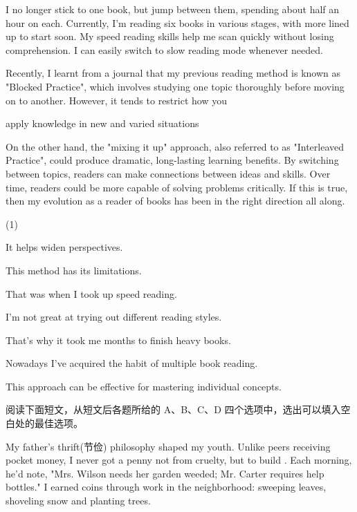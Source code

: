 \documentclass{英语试卷}
\begin{document}
\par {} I no longer stick to one book, but jump between them, spending about half an hour on each. Currently, I'm reading six books in various stages, with more lined up to start soon. My speed reading skills help me scan quickly without losing comprehension. I can easily switch to slow reading mode whenever needed.\par
\par Recently, I learnt from a journal that my previous reading method is known as "Blocked Practice", which involves studying one topic thoroughly before moving on to another.  However, it tends to restrict how you\par
\par apply knowledge in new and varied situations\par
\par On the other hand, the "mixing it up" approach, also referred to as "Interleaved Practice", could produce dramatic, long-lasting learning benefits. By switching between topics, readers can make connections between ideas and skills.  Over time, readers could be more capable of solving problems critically. If this is true, then my evolution as a reader of books has been in the right direction all along.\par
\begin{choices}(1)
  \item It helps widen perspectives.
  \item This method has its limitations.
  \item That was when I took up speed reading.
  \item I'm not great at trying out different reading styles.
  \item That's why it took me months to finish heavy books.
  \item Nowadays I've acquired the habit of multiple book reading.
  \item This approach can be effective for mastering individual concepts.
\end{choices}
\par 阅读下面短文，从短文后各题所给的 A、B、C、D 四个选项中，选出可以填入空白处的最佳选项。\par
\par My father's thrift(节俭) philosophy shaped my youth. Unlike peers receiving pocket money, I never got a penny not from cruelty, but to build . Each morning, he'd note, "Mrs. Wilson needs her garden weeded; Mr. Carter requires help  bottles." I earned coins through  work in the neighborhood: sweeping leaves, shoveling snow and planting trees.\par
\end{document}
